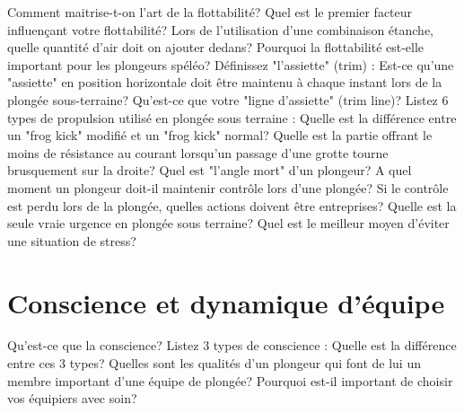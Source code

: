 \documentclass[english,1pt,a4paper]{article}
\begin{document}
	\begin{outline}
		\1 Comment maitrise-t-on l’art de la flottabilité?	\vspace{2cm}
		\1 Quel est le premier facteur influençant votre flottabilité?	\vspace{2cm}
		\1 Lors de l’utilisation d’une combinaison étanche, quelle quantité d’air doit on ajouter dedans?	\vspace{2cm}
		\1 Pourquoi la flottabilité est-elle important pour les plongeurs spéléo?	\vspace{2cm}
		\1 Définissez "l’assiette" (trim) :	\vspace{2cm}
		\1 Est-ce qu’une "assiette" en position horizontale doit être maintenu à chaque instant lors de la plongée sous-terraine?	\vspace{2cm}
		\1 Qu’est-ce que votre "ligne d’assiette" (trim line)?	\vspace{2cm}
		\1 Listez 6 types de propulsion utilisé en plongée sous terraine :	\vspace{2cm}
		\1 Quelle est la différence entre un "frog kick" modifié et un "frog kick" normal?	\vspace{2cm}
		\1 Quelle est la partie offrant le moins de résistance au courant lorsqu’un passage d’une grotte tourne brusquement sur la droite?	\vspace{2cm}
		\1 Quel est "l’angle mort" d’un plongeur?	\vspace{2cm}
		\1 A quel moment un plongeur doit-il maintenir contrôle lors d’une plongée?	\vspace{2cm}
		\1 Si le contrôle est perdu lors de la plongée, quelles actions doivent être entreprises?	\vspace{2cm}
		\1 Quelle est la seule vraie urgence en plongée sous terraine?	\vspace{2cm}
		\1 Quel est le meilleur moyen d’éviter une situation de stress?	\vspace{2cm}
	\end{outline}
	\pagebreak	

	\section{Conscience et dynamique d'équipe}

	\begin{outline}
		\1 Qu’est-ce que la conscience?	\vspace{2cm}
		\1 Listez 3 types de conscience :	\vspace{2cm}
		\1 Quelle est la différence entre ces 3 types?	\vspace{2cm}
		\1 Quelles sont les qualités d’un plongeur qui font de lui un membre important d’une équipe de plongée?	\vspace{2cm}
		\1 Pourquoi est-il important de choisir vos équipiers avec soin?	\vspace{2cm}
	\end{outline}
	\pagebreak	
\end{document}

